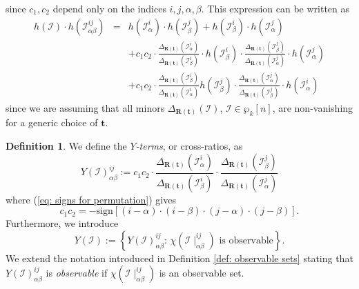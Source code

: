 \documentclass[10pt]{article}
\theoremstyle{remark}%
\theoremstyle{definition}%
\newtheorem{defn}{Definition}%
\begin{document}
since $c_{1},c_{2}$ depend only on the indices $i,j,\alpha,\beta$. This expression can be written as 
\begin{eqnarray}
h(\mathcal{I})\cdot h(\mathcal{I}_{\alpha\beta}^{ij}) & = & h(\mathcal{I}_{\alpha}^{i})\cdot h(\mathcal{I}_{\beta}^{j})+h(\mathcal{I}_{\beta}^{i})\cdot h(\mathcal{I}_{\alpha}^{j})\nonumber \\
& & +c_{1}c_{2}\cdot\frac{\Delta_{\mathbf{R}(\mathbf{t})}(\mathcal{I}_{\alpha}^{i})}{\Delta_{\mathbf{R}(\mathbf{t})}(\mathcal{I}_{\beta}^{i})}\cdot h(\mathcal{I}_{\beta}^{i})\cdot\frac{\Delta_{\mathbf{R}(\mathbf{t})}(\mathcal{I}_{\beta}^{j})}{\Delta_{\mathbf{R}(\mathbf{t})}(\mathcal{I}_{\alpha}^{j})}\cdot h(\mathcal{I}_{\alpha}^{j})\nonumber \\
&  & +c_{1}c_{2}\cdot\frac{\Delta_{\mathbf{R}(\mathbf{t})}(\mathcal{I}_{\beta}^{i})}{\Delta_{\mathbf{R}(\mathbf{t})}(\mathcal{I}_{\alpha}^{i})}h(\mathcal{I}_{\beta}^{j})\cdot\frac{\Delta_{\mathbf{R}(\mathbf{t})}(\mathcal{I}_{\alpha}^{j})}{\Delta_{\mathbf{R}(\mathbf{t})}(\mathcal{I}_{\beta}^{j})}\cdot h(\mathcal{I}_{\alpha}^{i})
\label{eq: quartic from Grassmann-Plucker, b}
\end{eqnarray}
since we are assuming that all minors $\Delta_{\mathbf{R}(\mathbf{t})}(\mathcal{I})$, $\mathcal{I}\in\wp_{k}[n]$, are non-vanishing for a generic choice of $\mathbf{t}$. 
\begin{defn} 
\label{def: observable Y-terms} 
We define the \emph{$Y$-terms}, or cross-ratios, as
 \begin{equation}
Y(\mathcal{I})_{\alpha\beta}^{ij}:=c_{1}c_{2}\cdot\frac{\Delta_{\mathbf{R}(\mathbf{t})}(\mathcal{I}_{\alpha}^{i})}{\Delta_{\mathbf{R}(\mathbf{t})}(\mathcal{I}_{\beta}^{i})}\cdot\frac{\Delta_{\mathbf{R}(\mathbf{t})}(\mathcal{I}_{\beta}^{j})}{\Delta_{\mathbf{R}(\mathbf{t})}(\mathcal{I}_{\alpha}^{j})}
\label{eq: cross-section}
 \end{equation}
where (\ref{eq: signs for permutation}) gives 
\begin{equation}
c_{1}c_{2}=-\mathrm{sign}\left[(i-\alpha)\cdot(i-\beta)\cdot(j-\alpha)\cdot(j-\beta)\right]. 
\label{eq: c1c2 sign for Y}
\end{equation}
Furthermore, we introduce 
 \begin{equation}
Y(\mathcal{I}):=\left\{ Y(\mathcal{I})_{\alpha\beta}^{ij}:\,\chi(\mathcal{I}\mid_{\alpha\beta}^{ij})\text{ is observable}\right\}.
\label{eq: set of Y-terms of observables}
 \end{equation}
We extend the notation introduced in Definition \ref{def: observable sets} stating that $Y(\mathcal{I})_{\alpha\beta}^{ij}$ is \emph{observable} if $\chi(\mathcal{I}\mid_{\alpha\beta}^{ij})$ is an observable set. 
\end{defn}
\end{document}
